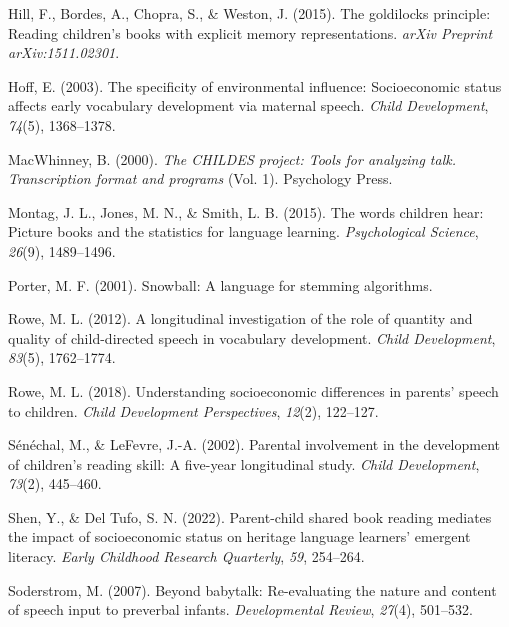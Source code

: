 \documentclass[10pt, letterpaper]{article}
\newenvironment{CSLReferences}%
  {}%
  {\par}
\begin{document}
\begin{CSLReferences}{1}{0}
\leavevmode{}%
Hill, F., Bordes, A., Chopra, S., \& Weston, J. (2015). The goldilocks
principle: Reading children's books with explicit memory
representations. \emph{arXiv Preprint arXiv:1511.02301}.

\leavevmode{}%
Hoff, E. (2003). The specificity of environmental influence:
Socioeconomic status affects early vocabulary development via maternal
speech. \emph{Child Development}, \emph{74}(5), 1368--1378.

\leavevmode{}%
MacWhinney, B. (2000). \emph{The CHILDES project: Tools for analyzing
talk. Transcription format and programs} (Vol. 1). Psychology Press.

\leavevmode{}%
Montag, J. L., Jones, M. N., \& Smith, L. B. (2015). The words children
hear: Picture books and the statistics for language learning.
\emph{Psychological Science}, \emph{26}(9), 1489--1496.

\leavevmode{}%
Porter, M. F. (2001). Snowball: A language for stemming algorithms.

\leavevmode{}%
Rowe, M. L. (2012). A longitudinal investigation of the role of quantity
and quality of child-directed speech in vocabulary development.
\emph{Child Development}, \emph{83}(5), 1762--1774.

\leavevmode{}%
Rowe, M. L. (2018). Understanding socioeconomic differences in parents'
speech to children. \emph{Child Development Perspectives}, \emph{12}(2),
122--127.

\leavevmode{}%
Sénéchal, M., \& LeFevre, J.-A. (2002). Parental involvement in the
development of children's reading skill: A five-year longitudinal study.
\emph{Child Development}, \emph{73}(2), 445--460.

\leavevmode{}%
Shen, Y., \& Del Tufo, S. N. (2022). Parent-child shared book reading
mediates the impact of socioeconomic status on heritage language
learners' emergent literacy. \emph{Early Childhood Research Quarterly},
\emph{59}, 254--264.

\leavevmode{}%
Soderstrom, M. (2007). Beyond babytalk: Re-evaluating the nature and
content of speech input to preverbal infants. \emph{Developmental
Review}, \emph{27}(4), 501--532.

\end{CSLReferences}


\end{document}
